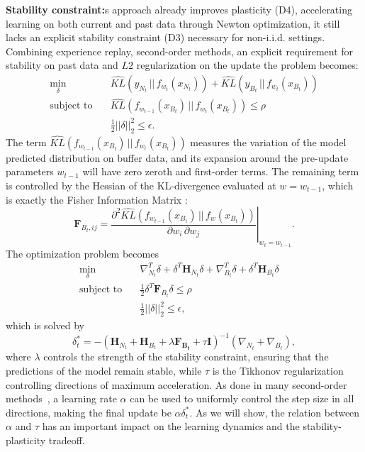 \textbf{Stability constraint:}s approach already improves plasticity (D4), accelerating learning on both current and past data through Newton optimization, it still lacks an explicit stability constraint (D3) necessary for non-i.i.d. settings. Combining experience replay, second-order methods, an explicit requirement for stability on past data and $L2$ regularization on the update the problem becomes:
\begin{equation*}
\begin{aligned}
\min_{\delta} \quad &\hat{KL}(y_{N_t} \, || \, f_{w_t}(x_{N_t})) +  \hat{KL}(y_{B_t} \, || \, f_{w_t}(x_{B_t}))\\
\text{subject to}\quad  &\hat{KL}(f_{w_{t-1}}(x_{B_t}) \, || \, f_{w_t}(x_{B_t})) \leq \rho\\
& \frac{1}{2}||\delta||_2^2 \leq \epsilon. 
\end{aligned}
\end{equation*}
The term $\hat{KL}(f_{w_{t-1}}(x_{B_t}) \, || \, f_{w_t}(x_{B_t}))$ measures the variation of the model predicted distribution on buffer data, and its expansion around the pre-update parameters $w_{t-1}$ will have zero zeroth and first-order terms. The remaining term is controlled by the Hessian of the KL-divergence evaluated at $w=w_{t-1}$, which is exactly the Fisher Information Matrix \cite{ollivier2017information} \cite{martens2020new}:
\begin{equation*}
    \mathbf{F}_{B_t, ij} = \left. \frac{\partial^2 \hat{KL}(f_{w_{t-1}}(x_{B_t}) \, || \, f_{w}(x_{B_t}))}{\partial w_i \, \partial w_j} \right|_{w_t = w_{t-1}}.
\end{equation*}
The optimization problem becomes
\begin{equation}\label{eq:complete_opt}
\begin{aligned}
\min_{\delta} \quad & \nabla_{N_t}^T \delta +  \delta^T \mathbf{H}_{N_t} \delta +  \nabla_{B_t}^T \delta +  \delta^T \mathbf{H}_{B_t} \delta\\
\text{subject to}\quad &\frac{1}{2}\delta^T \mathbf{F}_{B_t} \delta \leq \rho &\ \\
&\frac{1}{2}||\delta||_2^2 \leq \epsilon,
\end{aligned}
\end{equation}
which is solved by
\begin{equation*}
    \delta_t^* = -(\mathbf{H}_{N_t} + \mathbf{H}_{B_t} + \lambda \mathbf{F_{B_t}}+\tau \mathbf{I})^{-1}(\nabla_{N_t} + \nabla_{B_t}),
\end{equation*}
where $\lambda$ controls the strength of the stability constraint, ensuring that the predictions of the model remain stable, while $\tau$ is the Tikhonov regularization controlling directions of maximum acceleration. As done in many second-order methods~\cite{martens2020new,martens2012training}, a learning rate $\alpha$ can be used to uniformly control the step size in all directions, making the final update be $\alpha \delta_t^*$. As we will show, the relation between $\alpha$ and $\tau$ has an important impact on the learning dynamics and the stability-plasticity tradeoff. 

